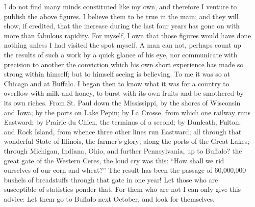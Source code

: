 I do not find many minds constituted like my own, and therefore I
venture to publish the above figures.  I believe them to be true in
the main; and they will show, if credited, that the increase during
the last four years has gone on with more than fabulous rapidity.
For myself, I own that those figures would have done nothing unless
I had visited the spot myself.  A man can not, perhaps count up the
results of such a work by a quick glance of his eye, nor
communicate with precision to another the conviction which his own
short experience has made so strong within himself; but to himself
seeing is believing.  To me it was so at Chicago and at Buffalo.  I
began then to know what it was for a country to overflow with milk
and honey, to burst with its own fruits and be smothered by its own
riches.  From St. Paul down the Mississippi, by the shores of
Wisconsin and Iowa; by the ports on Lake Pepin; by La Crosse, from
which one railway runs Eastward; by Prairie du Chien, the terminus
of a second; by Dunleath, Fulton, and Rock Island, from whence
three other lines run Eastward; all through that wonderful State of
Illinois, the farmer's glory; along the ports of the Great Lakes;
through Michigan, Indiana, Ohio, and further Pennsylvania, up to
Buffalo? the great gate of the Western Ceres, the loud cry was
this: ``How shall we rid ourselves of our corn and wheat?''  The
result has been the passage of 60,000,000 bushels of breadstuffs
through that gate in one year!  Let those who are susceptible of
statistics ponder that.  For them who are not I can only give this
advice: Let them go to Buffalo next October, and look for
themselves.

